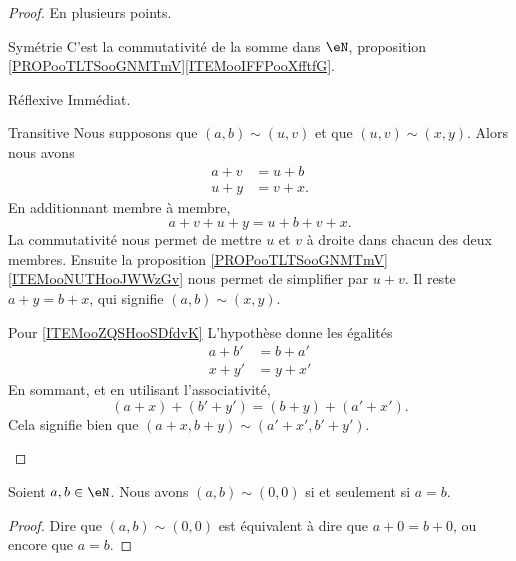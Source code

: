 \begin{proof}
    En plusieurs points.
    \begin{subproof}
    \item[Symétrie]
        C'est la commutativité de la somme dans \( \eN\), proposition \ref{PROPooTLTSooGNMTmV}\ref{ITEMooIFFPooXfftfG}.
    \item[Réflexive]
        Immédiat.
    \item[Transitive]
        Nous supposons que \( (a,b)\sim(u,v)\) et que \( (u,v)\sim(x,y)\). Alors nous avons
        \begin{subequations}
            \begin{align}
                a+v&=u+b\\
                u+y&=v+x.
            \end{align}
        \end{subequations}
        En additionnant membre à membre,
        \begin{equation}
            a+v+u+y=u+b+v+x.
        \end{equation}
        La commutativité nous permet de mettre \( u\) et \( v\) à droite dans chacun des deux membres. Ensuite la proposition \ref{PROPooTLTSooGNMTmV}\ref{ITEMooNUTHooJWWzGv} nous permet de simplifier par \( u+v\). Il reste \( a+y=b+x\), qui signifie \( (a,b)\sim(x,y)\).
    \item[Pour \ref{ITEMooZQSHooSDfdvK}]
        L'hypothèse donne les égalités
        \begin{subequations}
            \begin{align}
                a+b'&=b+a'\\
                x+y'&=y+x'
            \end{align}
        \end{subequations}
        En sommant, et en utilisant l'associativité,
        \begin{equation}
            (a+x)+(b'+y')=(b+y)+(a'+x').
        \end{equation}
        Cela signifie bien que \( (a+x,b+y)\sim(a'+x',b'+y')\).
    \end{subproof}
\end{proof}

\begin{lemma}
    Soient \( a,b\in \eN\). Nous avons \( (a,b)\sim (0,0)\) si et seulement si \( a=b\).
\end{lemma}

\begin{proof}
    Dire que \( (a,b)\sim (0,0)\) est équivalent à dire que \( a+0=b+0\), ou encore que \( a=b\).
\end{proof}

